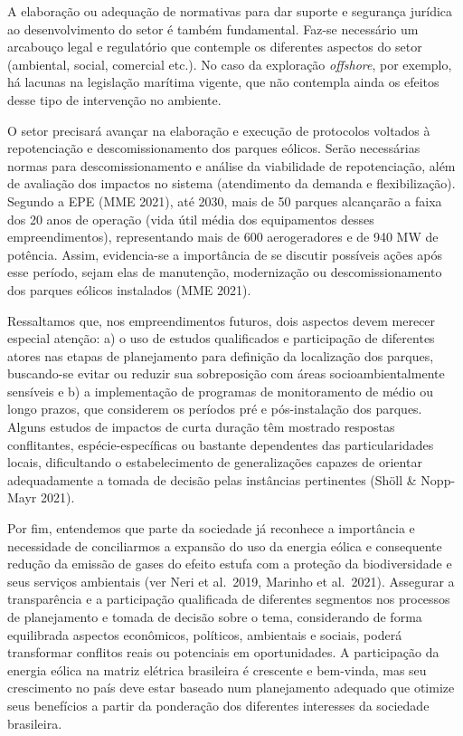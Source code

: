 \documentclass[
  oneside]{scrbook}
\begin{document}
A elaboração ou adequação de normativas para dar suporte e segurança jurídica ao desenvolvimento do setor é também fundamental. Faz-se necessário um arcabouço legal e regulatório que contemple os diferentes aspectos do setor (ambiental, social, comercial etc.). No caso da exploração \emph{offshore}, por exemplo, há lacunas na legislação marítima vigente, que não contempla ainda os efeitos desse tipo de intervenção no ambiente.

O setor precisará avançar na elaboração e execução de protocolos voltados à repotenciação e descomissionamento dos parques eólicos. Serão necessárias normas para descomissionamento e análise da viabilidade de repotenciação, além de avaliação dos impactos no sistema (atendimento da demanda e flexibilização). Segundo a EPE (MME 2021), até 2030, mais de 50 parques alcançarão a faixa dos 20 anos de operação (vida útil média dos equipamentos desses empreendimentos), representando mais de 600 aerogeradores e de 940 MW de potência. Assim, evidencia-se a importância de se discutir possíveis ações após esse período, sejam elas de manutenção, modernização ou descomissionamento dos parques eólicos instalados (MME 2021).

Ressaltamos que, nos empreendimentos futuros, dois aspectos devem merecer especial atenção: a) o uso de estudos qualificados e participação de diferentes atores nas etapas de planejamento para definição da localização dos parques, buscando-se evitar ou reduzir sua sobreposição com áreas socioambientalmente sensíveis e b) a implementação de programas de monitoramento de médio ou longo prazos, que considerem os períodos pré e pós-instalação dos parques. Alguns estudos de impactos de curta duração têm mostrado respostas conflitantes, espécie-específicas ou bastante dependentes das particularidades locais, dificultando o estabelecimento de generalizações capazes de orientar adequadamente a tomada de decisão pelas instâncias pertinentes (Shöll \& Nopp-Mayr 2021).

Por fim, entendemos que parte da sociedade já reconhece a importância e necessidade de conciliarmos a expansão do uso da energia eólica e consequente redução da emissão de gases do efeito estufa com a proteção da biodiversidade e seus serviços ambientais (ver Neri et al.~2019, Marinho et al.~2021). Assegurar a transparência e a participação qualificada de diferentes segmentos nos processos de planejamento e tomada de decisão sobre o tema, considerando de forma equilibrada aspectos econômicos, políticos, ambientais e sociais, poderá transformar conflitos reais ou potenciais em oportunidades. A participação da energia eólica na matriz elétrica brasileira é crescente e bem-vinda, mas seu crescimento no país deve estar baseado num planejamento adequado que otimize seus benefícios a partir da ponderação dos diferentes interesses da sociedade brasileira.
\end{document}
